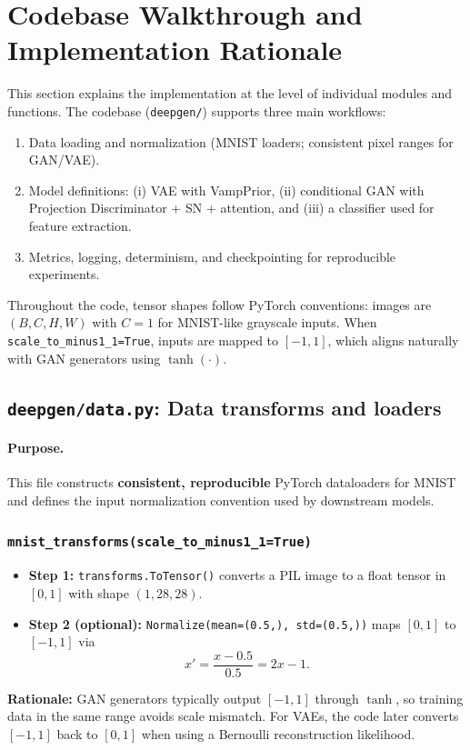 
\section{Codebase Walkthrough and Implementation Rationale}
\label{sec:code_explanation}

This section explains the implementation at the level of individual modules and functions. The codebase (\texttt{deepgen/}) supports three main workflows:
\begin{enumerate}
  \item Data loading and normalization (MNIST loaders; consistent pixel ranges for GAN/VAE).
  \item Model definitions: (i) VAE with VampPrior, (ii) conditional GAN with Projection Discriminator + SN + attention, and (iii) a classifier used for feature extraction.
  \item Metrics, logging, determinism, and checkpointing for reproducible experiments.
\end{enumerate}

Throughout the code, tensor shapes follow PyTorch conventions: images are \((B,C,H,W)\) with \(C=1\) for MNIST-like grayscale inputs. When \texttt{scale\_to\_minus1\_1=True}, inputs are mapped to \([-1,1]\), which aligns naturally with GAN generators using \(\tanh(\cdot)\).

\subsection{\texttt{deepgen/data.py}: Data transforms and loaders}
\label{subsec:code_data}

\paragraph{Purpose.}
This file constructs \textbf{consistent, reproducible} PyTorch dataloaders for MNIST and defines the input normalization convention used by downstream models.

\subsubsection*{\texttt{mnist\_transforms(scale\_to\_minus1\_1=True)}}
\begin{itemize}
  \item \textbf{Step 1:} \texttt{transforms.ToTensor()} converts a PIL image to a float tensor in \([0,1]\) with shape \((1,28,28)\).
  \item \textbf{Step 2 (optional):} \texttt{Normalize(mean=(0.5,), std=(0.5,))} maps \([0,1]\) to \([-1,1]\) via
  \[
  x' = \frac{x - 0.5}{0.5} = 2x - 1.
  \]
\end{itemize}
\textbf{Rationale:} GAN generators typically output \([-1,1]\) through \(\tanh\), so training data in the same range avoids scale mismatch. For VAEs, the code later converts \([-1,1]\) back to \([0,1]\) when using a Bernoulli reconstruction likelihood.

